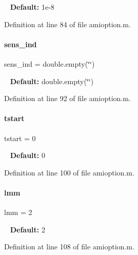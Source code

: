 ~\newline
{\bfseries{Default\+:}} 1e-\/8 

Definition at line 84 of file amioption.\+m.

\mbox{\label{classamioption_a0505783cf66f362672cbe3320d47a94d}} 
\paragraph{\texorpdfstring{sens\_ind}{sens\_ind}}
{\footnotesize\ttfamily sens\+\_\+ind = double.\+empty(\char`\"{}\char`\"{})}

~\newline
{\bfseries{Default\+:}} double.\+empty(\char`\"{}\char`\"{}) 

Definition at line 92 of file amioption.\+m.

\mbox{\label{classamioption_a18a69d8713604897ca9ee705d9d4fc4a}} 
\paragraph{\texorpdfstring{tstart}{tstart}}
{\footnotesize\ttfamily tstart = 0}

~\newline
{\bfseries{Default\+:}} 0 

Definition at line 100 of file amioption.\+m.

\mbox{\label{classamioption_a6f4b21b13e0c8c531c452c70b43fc96a}} 
\paragraph{\texorpdfstring{lmm}{lmm}}
{\footnotesize\ttfamily lmm = 2}

~\newline
{\bfseries{Default\+:}} 2 

Definition at line 108 of file amioption.\+m.

\mbox{\label{classamioption_a1fc3ae6bd5c6a80e9b81b27fc7b7a11a}} 
